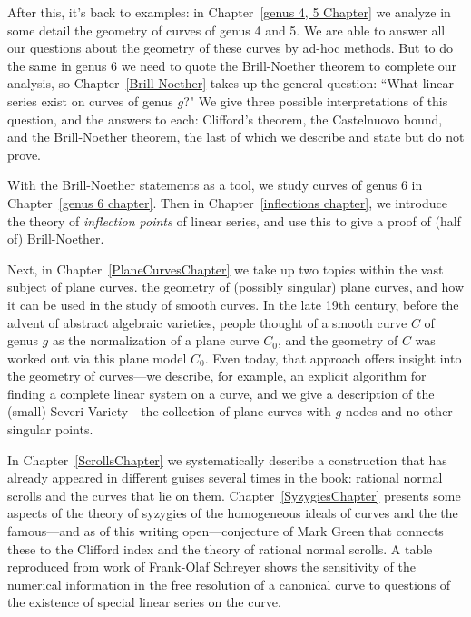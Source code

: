 After this, it's back to examples: in Chapter~\ref{genus 4, 5 Chapter} we analyze in some detail the geometry of curves of genus 4 and 5. We are able to answer all our questions about the geometry of these curves by ad-hoc methods. But to do the same  in genus 6 we need to quote the Brill-Noether theorem to complete our analysis, so Chapter~\ref{Brill-Noether} takes up the general
question: ``What linear series exist on curves of genus $g$?" We give three possible interpretations of this question, and the answers to each: Clifford's theorem, the Castelnuovo bound, and the Brill-Noether theorem, the last of which we describe and state but do not prove.

With the Brill-Noether statements as a tool, we study curves of genus 6 in Chapter~\ref{genus 6 chapter}. 
Then in Chapter~\ref{inflections chapter}, we introduce the theory of \emph{inflection points} of linear series, and use this to give a proof of (half of) Brill-Noether.


Next, in Chapter~\ref{PlaneCurvesChapter} we take up two topics within the vast subject  of plane curves. the geometry of (possibly singular) plane curves, and how it can be used in the study of smooth curves. In the late 19th century, before the advent of abstract algebraic varieties, people thought of a smooth curve $C$ of genus $g$  as the normalization of a plane curve $C_0$, and the geometry of $C$ was worked out via this plane model $C_0$. Even today, that approach offers insight into the geometry of curves---we describe, for example, an explicit algorithm for finding a complete linear system on a curve, and we give a description of the 
(small) Severi Variety---the collection of plane curves with $g$ nodes and no other singular points.

In Chapter~\ref{ScrollsChapter} we systematically describe a construction that has already appeared in different guises several times in the book: rational normal scrolls and the curves that lie on them. Chapter~\ref{SyzygiesChapter} presents some aspects of the theory of syzygies of the homogeneous ideals of curves and the the famous---and as of this writing open---conjecture of Mark Green that connects these to the Clifford index and the theory of rational normal scrolls. A table reproduced from work of Frank-Olaf Schreyer shows the sensitivity of the numerical information in the free resolution of a canonical curve to questions of the existence of special linear series on the curve.

